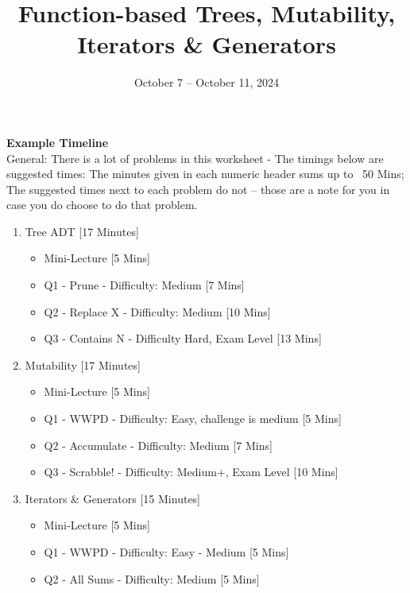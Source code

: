 \documentclass{exam}
\title{Function-based Trees, Mutability, Iterators \& Generators}
\date{October 7 -- October 11, 2024}
\begin{document}
\maketitle

\begin{meta}
    \textbf{Example Timeline}\\
    General: There is a lot of problems in this worksheet - The timings below are suggested times: The minutes given in each numeric header sums up to ~50 Mins; The suggested times next to each problem do not -- those are a note for you in case you do choose to do that problem.
    \begin{enumerate}
        \item Tree ADT [17 Minutes] {\begin{itemize} 
        \item Mini-Lecture [5 Mins]
        \item Q1 - Prune - Difficulty: Medium [7 Mins]
        \item Q2 - Replace X - Difficulty: Medium [10 Mins]
        \item Q3 - Contains N - Difficulty Hard, Exam Level [13 Mins]
        \end{itemize}}
        \item Mutability [17 Minutes] {\begin{itemize} 
            \item Mini-Lecture [5 Mins]
            \item Q1 - WWPD - Difficulty: Easy, challenge is medium [5 Mins]
            \item Q2 - Accumulate - Difficulty: Medium [7 Mins]
            \item Q3 - Scrabble! - Difficulty: Medium+, Exam Level [10 Mins]
        \end{itemize}}
        \item Iterators \& Generators [15 Minutes] {\begin{itemize} 
            \item Mini-Lecture [5 Mins]
            \item Q1 - WWPD - Difficulty: Easy - Medium [5 Mins]
            \item Q2 - All Sums - Difficulty: Medium [5 Mins]
        \end{itemize}}
    \end{enumerate}
\end{meta}
\end{document}

